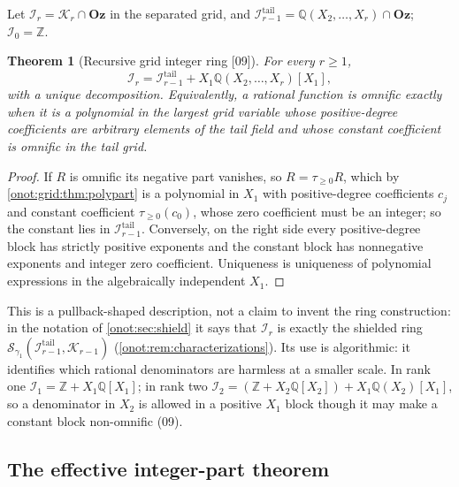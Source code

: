 \documentclass[11pt,oneside]{article}
\numberwithin{equation}{section}
\newtheorem{theorem}{Theorem}[section]
\theoremstyle{definition}
\theoremstyle{remark}
\newcommand{\Oz}{\mathbf{Oz}}
\newcommand{\Z}{\mathbb Z}
\newcommand{\Q}{\mathbb Q}
\newcommand{\IO}{\mathcal I}
\newcommand{\KG}{\mathcal K}
\newcommand{\tr}[1]{\tau_{\ge #1}}
\newcommand{\src}[1]{\textup{\textsf{\small[#1]}}}
\begin{document}
Let $\IO_r=\KG_r\cap\Oz$ in the separated grid, and
$\IO_{r-1}^{\mathrm{tail}}=\Q(X_2,\ldots,X_r)\cap\Oz$; $\IO_0=\Z$.

\begin{theorem}[Recursive grid integer ring \src{09}]\label{onot:grid:thm:gridring}
For every $r\ge1$,
\begin{equation}\label{onot:grid:eq:gridring}
 \IO_r=\IO_{r-1}^{\mathrm{tail}}+X_1\Q(X_2,\ldots,X_r)[X_1],
\end{equation}
with a unique decomposition. Equivalently, a rational function is omnific exactly
when it is a polynomial in the largest grid variable whose positive-degree
coefficients are arbitrary elements of the tail field and whose constant
coefficient is omnific in the tail grid.
\end{theorem}
\begin{proof}
If $R$ is omnific its negative part vanishes, so $R=\tr0R$, which by
\cref{onot:grid:thm:polypart} is a polynomial in $X_1$ with positive-degree
coefficients $c_j$ and constant coefficient $\tr0(c_0)$, whose zero coefficient
must be an integer; so the constant lies in $\IO_{r-1}^{\mathrm{tail}}$.
Conversely, on the right side every positive-degree block has strictly positive
exponents and the constant block has nonnegative exponents and integer zero
coefficient. Uniqueness is uniqueness of polynomial expressions in the
algebraically independent $X_1$.
\end{proof}

This is a pullback-shaped description, not a claim to invent the ring
construction: in the notation of \cref{onot:sec:shield} it says that $\IO_r$ is
exactly the shielded ring $\mathcal S_{\gamma_1}(\IO^{\mathrm{tail}}_{r-1},\KG_{r-1})$
(\cref{onot:rem:characterizations}). Its use is algorithmic: it identifies which
rational denominators are harmless at a smaller scale. In rank one
$\IO_1=\Z+X_1\Q[X_1]$; in rank two
$\IO_2=(\Z+X_2\Q[X_2])+X_1\Q(X_2)[X_1]$, so a denominator in $X_2$ is allowed in a
positive $X_1$ block though it may make a constant block non-omnific (09).

\subsection{The effective integer-part theorem}
\end{document}
